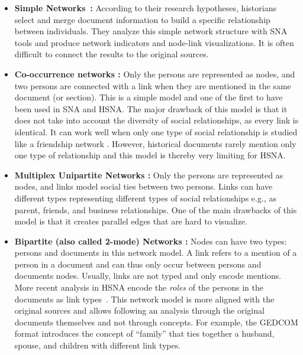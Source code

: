 \begin{itemize}[nosep,leftmargin=*]
    \item \textbf{Simple Networks~\cite{wetherell_historical_1998}:} According to their research hypotheses, historians select and merge document information to build a specific relationship between individuals. They analyze this simple network structure with SNA tools and produce network indicators and node-link visualizations. It is often difficult to connect the results to the original sources.
    \item \textbf{Co-occurrence networks \cite{sairioMethodologicalPracticalAspects2009}:}
    Only the persons are represented as nodes, and two persons are connected with a link when they are mentioned in the same document (or section).
    This is a simple model and one of the first to have been used in SNA and HSNA. The major drawback of this model is that it does not take into account the diversity of social relationships, as every link is identical. It can work well when only one type of social relationship is studied like a friendship network \cite{moreno_foundations_1941}. However, historical documents rarely mention only one type of relationship and this model is thereby very limiting for HSNA.
    \item \textbf{Multiplex Unipartite Networks \cite{eriksonMalfeasanceFoundationsGlobal2006b} :} Only the persons are represented as nodes, and links model social ties between two persons. Links can have different types representing different types of social relationships
    e.g., as parent, friends, and business relationships. One of the main drawbacks of this model is that it creates parallel edges that are hard to visualize.
    \item \textbf{Bipartite (also called 2-mode) Networks
    \cite{hamberger_scanning_2014}
    :} Nodes can have two types: persons and documents in this network model. A link refers to a mention of a person in a document and can thus only occur between persons and documents nodes. Usually, links are not typed and only encode mentions.
    More recent analysis in HSNA encode the \emph{roles} of the persons in the documents as link types~\cite{Cristofoli2018}. This network model is more aligned with the original sources and allows following an analysis through the original documents themselves and not through concepts. For example, the GEDCOM format introduces the concept of ``family'' that ties together a husband, spouse, and children with different link types.

\end{itemize}
